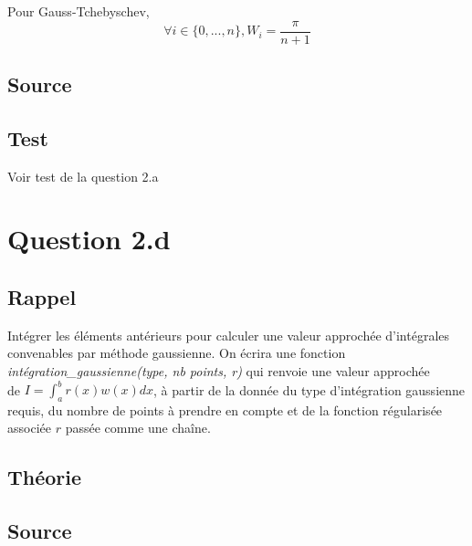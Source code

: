 \documentclass[a4paper,10pt]{report}
\begin{document}
Pour Gauss-Tchebyschev,
\begin{equation*}
\forall{i} \in \{0, ..., n\}, W_i = \frac{\pi}{n+1}
\end{equation*}


\subsection*{Source}

\begin{center}
	
	
\end{center}

\subsection*{Test}

Voir test de la question 2.a


\section*{Question 2.d}

\subsection*{Rappel}

Intégrer les éléments antérieurs pour calculer une valeur approchée d’intégrales convenables par méthode gaussienne. On écrira une fonction \textit{intégration\_gaussienne(type, nb points, r)} qui renvoie une valeur approchée \\de $I=\int_{a}^{b}r(x)w(x)dx$, à partir de la donnée du type d’intégration gaussienne requis, du nombre
de points à prendre en compte et de la fonction régularisée associée $r$ passée comme une chaîne.
 

\subsection*{Théorie}


\subsection*{Source}

\end{document}
